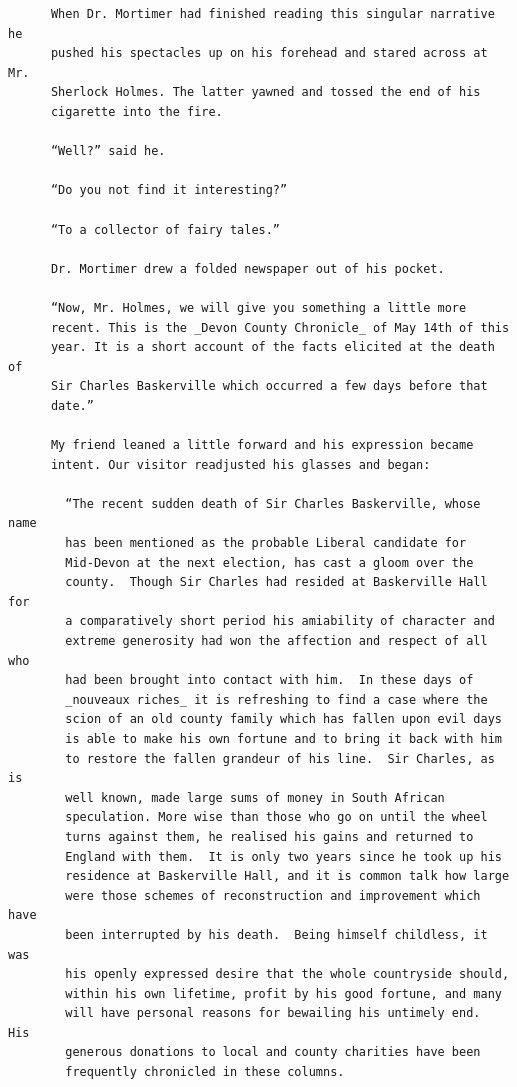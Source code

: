 \documentclass{article}
\begin{document}
\begin{verbatim}
      When Dr. Mortimer had finished reading this singular narrative he
      pushed his spectacles up on his forehead and stared across at Mr.
      Sherlock Holmes. The latter yawned and tossed the end of his
      cigarette into the fire.

      “Well?” said he.

      “Do you not find it interesting?”

      “To a collector of fairy tales.”

      Dr. Mortimer drew a folded newspaper out of his pocket.

      “Now, Mr. Holmes, we will give you something a little more
      recent. This is the _Devon County Chronicle_ of May 14th of this
      year. It is a short account of the facts elicited at the death of
      Sir Charles Baskerville which occurred a few days before that
      date.”

      My friend leaned a little forward and his expression became
      intent. Our visitor readjusted his glasses and began:

        “The recent sudden death of Sir Charles Baskerville, whose name
        has been mentioned as the probable Liberal candidate for
        Mid-Devon at the next election, has cast a gloom over the
        county.  Though Sir Charles had resided at Baskerville Hall for
        a comparatively short period his amiability of character and
        extreme generosity had won the affection and respect of all who
        had been brought into contact with him.  In these days of
        _nouveaux riches_ it is refreshing to find a case where the
        scion of an old county family which has fallen upon evil days
        is able to make his own fortune and to bring it back with him
        to restore the fallen grandeur of his line.  Sir Charles, as is
        well known, made large sums of money in South African
        speculation. More wise than those who go on until the wheel
        turns against them, he realised his gains and returned to
        England with them.  It is only two years since he took up his
        residence at Baskerville Hall, and it is common talk how large
        were those schemes of reconstruction and improvement which have
        been interrupted by his death.  Being himself childless, it was
        his openly expressed desire that the whole countryside should,
        within his own lifetime, profit by his good fortune, and many
        will have personal reasons for bewailing his untimely end.  His
        generous donations to local and county charities have been
        frequently chronicled in these columns.


\end{verbatim}
\end{document}
